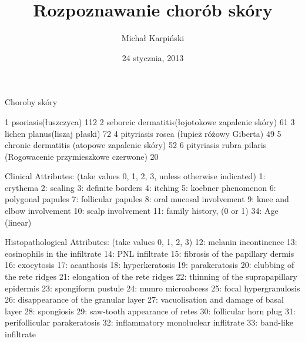 \documentclass{beamer}
\title{Rozpoznawanie chorób skóry}
\author{Michał Karpiński}
\date{24 stycznia, 2013}
\begin{document}
\begin{frame}[plain]
  \titlepage
\end{frame}

\begin{frame}{Choroby skóry}

       1             psoriasis(łuszczyca)	     112
       2             seboreic dermatitis(łojotokowe zapalenie skóry)             61
       3             lichen planus(liszaj płaski)    72
       4             pityriasis rosea (łupież różowy Giberta)                49
       5             chronic dermatitis (atopowe zapalenie skóry)               52    
       6             pityriasis rubra pilaris (Rogowacenie przymieszkowe czerwone)       20

Clinical Attributes: (take values 0, 1, 2, 3, unless otherwise indicated)
      1: erythema
      2: scaling
      3: definite borders
      4: itching
      5: koebner phenomenon
      6: polygonal papules
      7: follicular papules
      8: oral mucosal involvement
      9: knee and elbow involvement
     10: scalp involvement
     11: family history, (0 or 1)
     34: Age (linear)

Histopathological Attributes: (take values 0, 1, 2, 3)
     12: melanin incontinence
     13: eosinophils in the infiltrate
     14: PNL infiltrate
     15: fibrosis of the papillary dermis
     16: exocytosis
     17: acanthosis
     18: hyperkeratosis
     19: parakeratosis
     20: clubbing of the rete ridges
     21: elongation of the rete ridges
     22: thinning of the suprapapillary epidermis
     23: spongiform pustule
     24: munro microabcess
     25: focal hypergranulosis
     26: disappearance of the granular layer
     27: vacuolisation and damage of basal layer
     28: spongiosis
     29: saw-tooth appearance of retes
     30: follicular horn plug
     31: perifollicular parakeratosis
     32: inflammatory monoluclear inflitrate
     33: band-like infiltrate

\end{frame}

\end{document}
